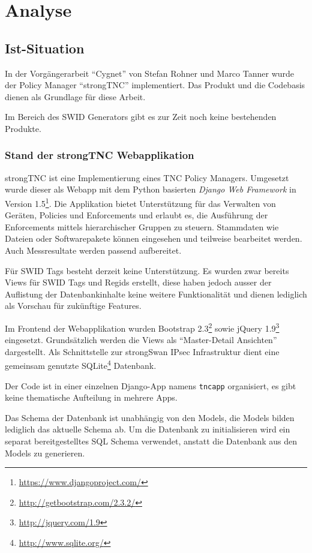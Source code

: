 \chapter{Analyse}

\section{Ist-Situation}

In der Vorgängerarbeit \enquote{Cygnet} von Stefan Rohner und Marco
Tanner\cite{cygnet:2013} wurde der Policy Manager \enquote{strongTNC}
implementiert. Das Produkt und die Codebasis dienen als Grundlage
für diese Arbeit.

Im Bereich des SWID Generators gibt es zur Zeit noch keine bestehenden Produkte.

\subsection{Stand der strongTNC Webapplikation} 
\label{analyse:stand}

strongTNC ist eine Implementierung eines TNC Policy Managers. Umgesetzt wurde
dieser als Webapp mit dem Python basierten \textit{Django Web Framework} in
Version 1.5\footnote{\url{https://www.djangoproject.com/}}. Die Applikation
bietet Unterstützung für das Verwalten von Geräten, Policies und Enforcements
und erlaubt es, die Ausführung der Enforcements mittels hierarchischer Gruppen
zu steuern. Stammdaten wie Dateien oder Softwarepakete können eingesehen und
teilweise bearbeitet werden. Auch Messresultate werden passend aufbereitet.

Für SWID Tags besteht derzeit keine Unterstützung. Es wurden zwar bereits Views
für SWID Tags und Regids erstellt, diese haben jedoch ausser der Auflistung der
Datenbankinhalte keine weitere Funktionalität und dienen lediglich als Vorschau
für zukünftige Features.

Im Frontend der Webapplikation wurden Bootstrap
2.3\footnote{\url{http://getbootstrap.com/2.3.2/}} sowie jQuery
1.9\footnote{\url{http://jquery.com/1.9}} eingesetzt. Grundsätzlich werden die
Views als \enquote{Master-Detail Ansichten} dargestellt. Als Schnittstelle zur
strongSwan IPsec Infrastruktur dient eine gemeinsam genutzte
SQLite\footnote{\url{http://www.sqlite.org/}} Datenbank.

Der Code ist in einer einzelnen Django-App namens \texttt{tncapp} organisiert,
es gibt keine thematische Aufteilung in mehrere Apps.

Das Schema der Datenbank ist unabhängig von den Models, die Models bilden
lediglich das aktuelle Schema ab. Um die Datenbank zu initialisieren wird ein
separat bereitgestelltes SQL Schema verwendet, anstatt die Datenbank aus den
Models zu generieren.

